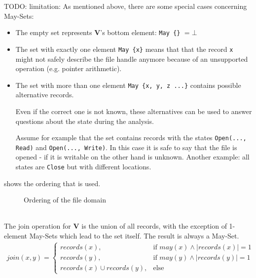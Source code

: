 TODO: limitation: %
As mentioned above, there are some special cases concerning May-Sets:
\begin{itemize}
\item The empty set represents \textbf{V}'s bottom element: \verb|May {}| $ = \bot$
\item The set with exactly one element \verb|May {x}| means that that the record \verb|x| might not safely describe the file handle anymore because of an unsupported operation (e.g. pointer arithmetic).
\item The set with more than one element \verb|May {x, y, z ...}| contains possible alternative records. 

Even if the correct one is not known, these alternatives can be used to answer questions about the state during the analysis.

Assume for example that the set contains records with the states \verb|Open(..., Read)| and \verb|Open(..., Write)|. In this case it is safe to say that the file is opened - if it is writable on the other hand is unknown. Another example: all states are \verb|Close| but with different locations. %
\end{itemize}
 shows the ordering that is used.
\begin{figure}[ht]
  \centering
{}
  \caption{Ordering of the file domain}
  \label{fig:fileDomain}
\end{figure}\\
The join operation for \textbf{V} is the union of all records, with the exception of 1-element May-Sets which lead to the set itself. The result is always a May-Set.
\begin{align*}
join(x,y)=\left\{\begin{array}{cl}
records(x), & \mbox{if }may(x) \wedge |records(x)|=1\\
records(y), & \mbox{if }may(y) \wedge |records(y)|=1\\
records(x) \cup records(y), & \mbox{else} \end{array}\right.
\end{align*}


